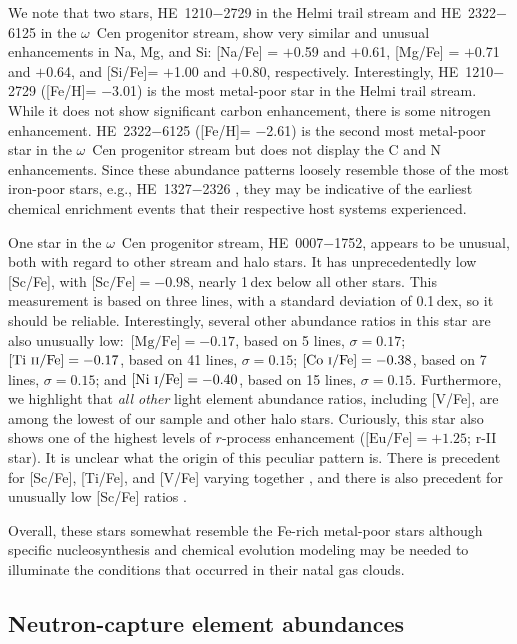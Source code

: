 \documentclass[twocolumn]{aastex63}
\begin{document}
We note that two stars, HE~1210$-$2729 in the Helmi trail stream and HE~2322$-$6125 in the $\omega$~Cen progenitor stream, show very similar and unusual enhancements in Na, Mg, and Si: [Na/Fe] = $+$0.59 and $+$0.61, [Mg/Fe] = $+$0.71 and $+$0.64, and [Si/Fe]= $+$1.00 and $+$0.80, respectively. Interestingly, HE~1210$-$2729 ([Fe/H]= $-$3.01) is the most metal-poor star in the Helmi trail stream. While it does not show significant carbon enhancement, there is some nitrogen enhancement.
HE~2322$-$6125 ([Fe/H]= $-$2.61) is the second most metal-poor star in the $\omega$~Cen progenitor stream but does not display the C and N enhancements. Since these abundance patterns loosely resemble those of the most iron-poor stars, e.g., HE~1327$-$2326 \citep{frebel05}, they may be indicative of the earliest chemical enrichment events that their respective host systems experienced. 

One star in the $\omega$~Cen progenitor stream, HE~0007$-$1752, appears to be unusual, both with regard to other stream and halo stars. It has unprecedentedly low [Sc/Fe], with $\mbox{[Sc/Fe]}=-0.98$, nearly 1\,dex below all other stars. This measurement is based on three lines, with a standard deviation of 0.1\,dex, so it should be reliable. Interestingly, several other abundance ratios in this star are also unusually low:\ 
$\mbox{[Mg/Fe]}=-0.17$, based on 5 lines, $\sigma=0.17$;
$\mbox{[Ti~\textsc{ii}/Fe]}=-0.17$, based on 41 lines, $\sigma=0.15$;
$\mbox{[Co~\textsc{i}/Fe]}=-0.38$, based on 7 lines, $\sigma=0.15$; and
$\mbox{[Ni~\textsc{i}/Fe]}=-0.40$, based on 15 lines, $\sigma=0.15$.
Furthermore, we highlight that \textit{all other} light element abundance ratios, including [V/Fe], are among the lowest of our sample and other halo stars. Curiously, this star also shows one of the highest levels of $r$-process enhancement ($\mbox{[Eu/Fe]}= +1.25$; r-II star). 
It is unclear what the origin of this peculiar pattern is.
There is precedent for [Sc/Fe], [Ti/Fe], and [V/Fe] varying together \citep{Sneden16,cowan20,ou20}, and
there is also precedent for unusually low [Sc/Fe] ratios \citep{casey15,ji20_car}.

Overall, these stars somewhat resemble the Fe-rich metal-poor stars \citep{Yong13a, Jacobson15, Mcwilliam18, sakari19} although specific nucleosynthesis and chemical evolution modeling may be needed to illuminate the conditions that occurred in their natal gas clouds.




\subsection{Neutron-capture element abundances}
\end{document}
